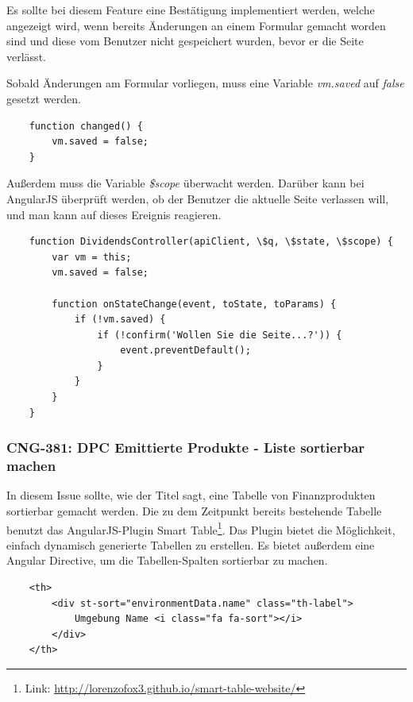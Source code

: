 \documentclass[chapterprefix=false, 12pt, a4paper, oneside, parskip=half, listof=totoc, bibliography=totoc, numbers=noendperiod]{scrbook}
\begin{document}
    Es sollte bei diesem Feature eine Bestätigung implementiert werden, welche angezeigt wird, wenn bereits Änderungen an einem Formular
    gemacht worden sind und diese vom Benutzer nicht gespeichert wurden, bevor er die Seite verlässt.

    Sobald Änderungen am Formular vorliegen, muss eine Variable \textit{vm.saved} auf \textit{false} gesetzt werden.

    \begin{verbatim}
    function changed() {
        vm.saved = false;
    }
    \end{verbatim}

    Außerdem muss die Variable \textit{\$scope} überwacht werden. Darüber kann bei AngularJS überprüft werden, ob der
    Benutzer die aktuelle Seite verlassen will, und man kann auf dieses Ereignis reagieren.

    \begin{verbatim}
    function DividendsController(apiClient, \$q, \$state, \$scope) {
        var vm = this;
        vm.saved = false;

        function onStateChange(event, toState, toParams) {
            if (!vm.saved) {
                if (!confirm('Wollen Sie die Seite...?')) {
                    event.preventDefault();
                }
            }
        }
    }
    \end{verbatim}

    \subsubsection{CNG-381: DPC Emittierte Produkte - Liste sortierbar machen}

    In diesem Issue sollte, wie der Titel sagt, eine Tabelle von Finanzprodukten sortierbar gemacht werden.
    Die zu dem Zeitpunkt bereits bestehende Tabelle benutzt das AngularJS-Plugin Smart Table\footnote{Link: \url{http://lorenzofox3.github.io/smart-table-website/}}.
    Das Plugin bietet die Möglichkeit, einfach dynamisch generierte Tabellen zu erstellen. Es bietet außerdem eine Angular Directive, um die Tabellen-Spalten sortierbar zu machen.

    \begin{verbatim}
    <th>
        <div st-sort="environmentData.name" class="th-label">
            Umgebung Name <i class="fa fa-sort"></i>
        </div>
    </th>
    \end{verbatim}
\end{document}
